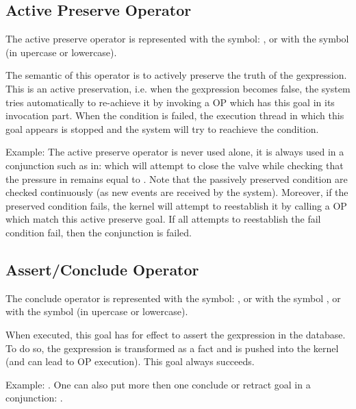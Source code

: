 \subsection{Active Preserve Operator}

The active preserve operator is represented with the symbol: \samp{\%}, or with the
symbol  (in upercase or lowercase).

The semantic of this operator is to actively preserve the truth of the
gexpression. This is an active preservation, i.e. when the gexpression
becomes false, the system tries automatically to re-achieve it by
invoking a OP which has this goal in its invocation part. When the condition is
failed, the execution thread in which this goal appears is stopped and the
system will try to reachieve the condition.

Example: The active preserve operator is never used alone, it is always used in a
conjunction such as in:  which will attempt to close the valve while checking that the pressure
in  remains equal to . Note that the passively preserved
condition are checked continuously (as new events are received by the system).
Moreover, if the preserved condition fails, the kernel will attempt to
reestablish it by calling a OP which match this active preserve goal. If all
attempts to reestablish the fail condition fail, then the conjunction is failed.

\subsection{Assert/Conclude Operator}

The conclude operator is represented with the symbol: \samp{=>}, or with the
symbol , or with the symbol  (in upercase or
lowercase).

When executed, this goal has for effect to assert the gexpression in the
database. To do so, the gexpression is transformed as a fact and is pushed
into the kernel (and can lead to OP execution). This goal always succeeds.

Example: . One can also put more then one
conclude or retract goal in a conjunction: .

